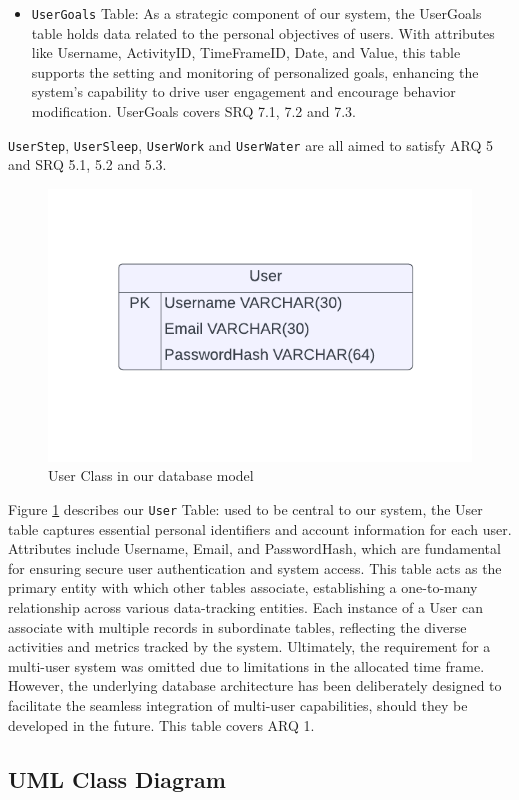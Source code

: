 \documentclass[12pt]{article}
\begin{document}
\begin{itemize}
    \item \texttt{UserGoals} Table: As a strategic component of our system, the
        UserGoals table holds data related to the personal objectives of users.
        With attributes like Username, ActivityID, TimeFrameID, Date, and
        Value, this table supports the setting and monitoring of personalized
        goals, enhancing the system's capability to drive user engagement and
        encourage behavior modification. UserGoals covers SRQ 7.1, 7.2 and
        7.3.\par

\end{itemize}

\texttt{UserStep}, \texttt{UserSleep}, \texttt{UserWork} and \texttt{UserWater}
are all aimed to satisfy ARQ 5 and SRQ 5.1, 5.2 and 5.3.

\begin{figure}[!ht]
  \centering
  \includegraphics[width = 0.4\linewidth]{PI Systems Database-2}
  \caption{User Class in our database model}
  \label{fig:User_Table}
\end{figure}

Figure \ref{fig:User_Table} describes our \texttt{User} Table: used to be
central to our system, the User table captures essential personal identifiers and
account information for each user. Attributes include Username, Email, and
PasswordHash, which are fundamental for ensuring secure user authentication and
system access. This table acts as the primary entity with which other tables
associate, establishing a one-to-many relationship across various data-tracking
entities. Each instance of a User can associate with multiple records in
subordinate tables, reflecting the diverse activities and metrics tracked by the
system. Ultimately, the requirement for a multi-user system was omitted due to
limitations in the allocated time frame. However, the underlying database
architecture has been deliberately designed to facilitate the seamless
integration of multi-user capabilities, should they be developed in the future.
This table covers ARQ 1.

\subsection{UML Class Diagram}
\end{document}
